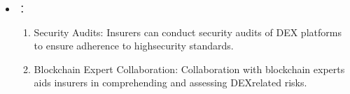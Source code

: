 \documentclass[letterpaper,10pt,english]{jupyterBook}
\begin{document}
\begin{itemize}
\begin{enumerate}
\item {} 
\sphinxAtStartPar
Pricing Data Limitation: The absence of pricing data for DEX\sphinxhyphen{}related risks could hinder accurate insurance product pricing.

\end{enumerate}

\item {} 
\sphinxAtStartPar
{}：
\begin{enumerate}
%
\item {} 
\sphinxAtStartPar
Security Audits: Insurers can conduct security audits of DEX platforms to ensure adherence to high\sphinxhyphen{}security standards.

\item {} 
\sphinxAtStartPar
Blockchain Expert Collaboration: Collaboration with blockchain experts aids insurers in comprehending and assessing DEX\sphinxhyphen{}related risks.

\end{enumerate}

\end{itemize}
\end{document}
